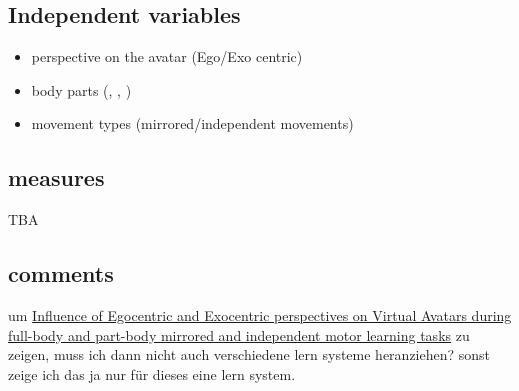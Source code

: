 \subsection{Independent variables}
\begin{itemize}
	\item perspective on the avatar (Ego/Exo centric)
	\item body parts (\UB, \LB, \FB)
	\item movement types (mirrored/independent movements)
\end{itemize}

\subsection{measures}
TBA


\subsection{comments}
um \underline{Influence of Egocentric and Exocentric perspectives on Virtual Avatars during full-body and part-body mirrored and independent motor learning tasks} zu zeigen, muss ich dann nicht auch verschiedene lern systeme heranziehen? sonst zeige ich das ja nur für dieses eine lern system.
